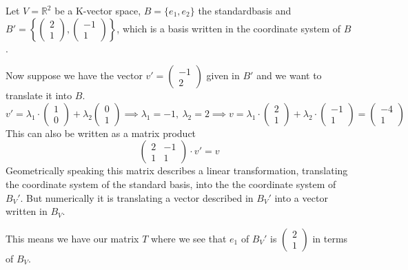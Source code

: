 \begin{example}
   Let \(V = \mathbb{R}^2\) be a K-vector space, \(B = \{e_1, e_2\}\) the standardbasis and \(B' = \left\{\begin{pmatrix}2 \\1\end{pmatrix}, \begin{pmatrix}-1\\1\end{pmatrix}\right\}\), which is a basis written in the coordinate system of \(B\).

   Now suppose we have the vector \(v' = \begin{pmatrix}-1\\2\end{pmatrix}\) given in \(B'\) and we want to translate it into \(B\).
   \[v' = \lambda_1 \cdot \begin{pmatrix}1\\0\end{pmatrix} + \lambda_2 \begin{pmatrix}0\\1\end{pmatrix} \implies \lambda_1 = -1,~\lambda_2 = 2 \implies v = \lambda_1 \cdot \begin{pmatrix}2\\1\end{pmatrix} + \lambda_2 \cdot \begin{pmatrix}-1\\1\end{pmatrix} = \begin{pmatrix}-4\\1\end{pmatrix}\]
   This can also be written as a matrix product
   \[\begin{pmatrix}2 & -1\\1 & 1\end{pmatrix} \cdot v' = v\]
   Geometrically speaking this matrix describes a linear transformation, translating the coordinate system of the standard basis, into the the coordinate system of \(B_V'\).
   But numerically it is translating a vector described in \(B_V'\) into a vector written in \(B_V\).

   This means we have our matrix \(T\) where we see that \(e_1\) of \(B_V'\) is \(\begin{pmatrix}2\\1\end{pmatrix}\) in terms of \(B_V\).
\end{example}

